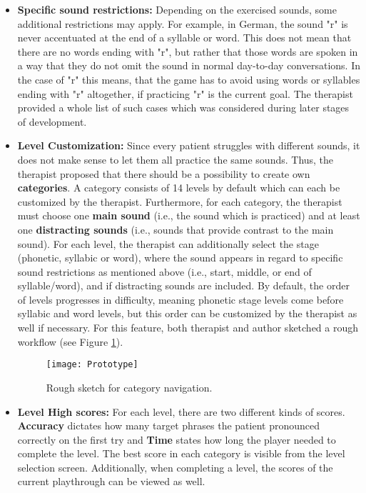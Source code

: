 \documentclass[draft,final]{vutinfth} %
\begin{document}
\begin{itemize}
\item \textbf{Specific sound restrictions:} Depending on the exercised sounds, some additional restrictions may apply. For example, in German, the sound "r" is never accentuated at the end of a syllable or word. This does not mean that there are no words ending with "r", but rather that those words are spoken in a way that they do not omit the sound in normal day-to-day conversations. In the case of "r" this means, that the game has to avoid using words or syllables ending with "r" altogether, if practicing "r" is the current goal. The therapist provided a whole list of such cases which was considered during later stages of development.
\item \textbf{Level Customization:} Since every patient struggles with different sounds, it does not make sense to let them all practice the same sounds. Thus, the therapist proposed that there should be a possibility to create own \textbf{categories}. A category consists of 14 levels by default which can each be customized by the therapist. Furthermore, for each category, the therapist must choose one \textbf{main sound} (i.e., the sound which is practiced) and at least one \textbf{distracting sounds} (i.e., sounds that provide contrast to the main sound). For each level, the therapist can additionally select the stage (phonetic, syllabic or word), where the sound appears in regard to specific sound restrictions as mentioned above (i.e., start, middle, or end of syllable/word), and if distracting sounds are included. By default, the order of levels progresses in difficulty, meaning phonetic stage levels come before syllabic and word levels, but this order can be customized by the therapist as well if necessary. For this feature, both therapist and author sketched a rough workflow (see Figure \ref{fig:prototype}).
\begin{figure}
\begin{center}
\texttt{[image: Prototype]}
\end{center}
\caption{Rough sketch for category navigation.}
\label{fig:prototype}
\end{figure}
\item \textbf{Level High scores:} For each level, there are two different kinds of scores. \textbf{Accuracy} dictates how many target phrases the patient pronounced correctly on the first try and \textbf{Time} states how long the player needed to complete the level. The best score in each category is visible from the level selection screen. Additionally, when completing a level, the scores of the current playthrough can be viewed as well.

\end{itemize}
\end{document}
